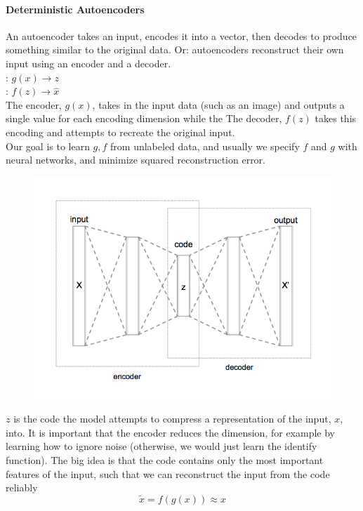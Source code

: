 \documentclass[11pt]{article}
\begin{document}
\paragraph{Deterministic Autoencoders}
An autoencoder takes an input, encodes it into a vector, then decodes to produce something similar to the original data. Or: autoencoders reconstruct their own input using an encoder and a decoder. \\
: $g(x) \rightarrow z$\\
: $f(z) \rightarrow \hat{x}$\\
The encoder, $g(x)$, takes in the input data (such as an image) and outputs a single value for each encoding dimension while the The decoder, $f(z)$ takes this encoding and attempts to recreate the original input.\\
Our goal is to learn $g, f$ from unlabeled data, and usually we specify $f$ and $g$ with neural networks, and minimize squared reconstruction error.
\begin{figure}[H]
	\centering
	\includegraphics[scale=0.6]{p13.png}
\end{figure}
$z$ is the code the model attempts to compress a representation of the input, $x$, into.
It is important that the encoder reduces the dimension, for example by learning how to ignore noise (otherwise, we would just learn the identify function). The big idea is that the code contains only the most important features of the input, such that we can reconstruct the input from the code reliably
$$\tilde{x} = f(g(x)) \approx x$$
\end{document}
